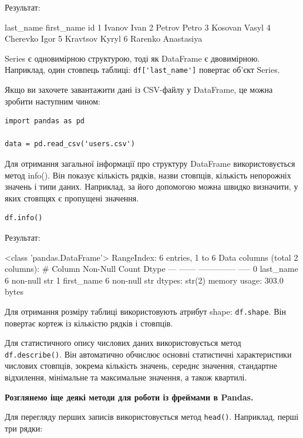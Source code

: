 Результат:

\begin{console}
	last_name	first_name
id		
1	Ivanov	Ivan
2	Petrov	Petro
3	Kosovan	Vasyl
4	Cherevko	Igor
5	Kravtsov	Kyryl
6	Rarenko	Anastasiya
\end{console}

Series є одновимірною структурою, тоді як DataFrame є двовимірною. Наприклад, один стовпець таблиці: \verb|df['last_name']| повертає об'єкт Series.

Якщо ви захочете завантажити дані із CSV-файлу у DataFrame, це можна зробити наступним чином:

\begin{lstlisting}
import pandas as pd

data = pd.read_csv('users.csv')
\end{lstlisting}

Для отримання загальної інформації про структуру DataFrame використовується метод info(). Він показує кількість рядків, назви стовпців, кількість непорожніх значень і типи даних. Наприклад, за його допомогою можна швидко визначити, у яких стовпцях є пропущені значення.

\begin{lstlisting}
df.info()
\end{lstlisting}

Результат:

\begin{console}
<class 'pandas.DataFrame'>
RangeIndex: 6 entries, 1 to 6
Data columns (total 2 columns):
 #   Column      Non-Null Count  Dtype
---  ------      --------------  -----
 0   last_name   6 non-null      str  
 1   first_name  6 non-null      str  
dtypes: str(2)
memory usage: 303.0 bytes
\end{console}

Для отримання розміру таблиці використовують атрибут shape: \verb|df.shape|. Він повертає кортеж із кількістю рядків і стовпців.

Для статистичного опису числових даних використовується метод \verb|df.describe()|. Він автоматично обчислює основні статистичні характеристики числових стовпців, зокрема кількість значень, середнє значення, стандартне відхилення, мінімальне та максимальне значення, а також квартилі.

\textbf{Розглянемо іще деякі методи для роботи із фреймами в Pandas.}

Для перегляду перших записів використовується метод \verb|head()|. Наприклад, перші три рядки:


